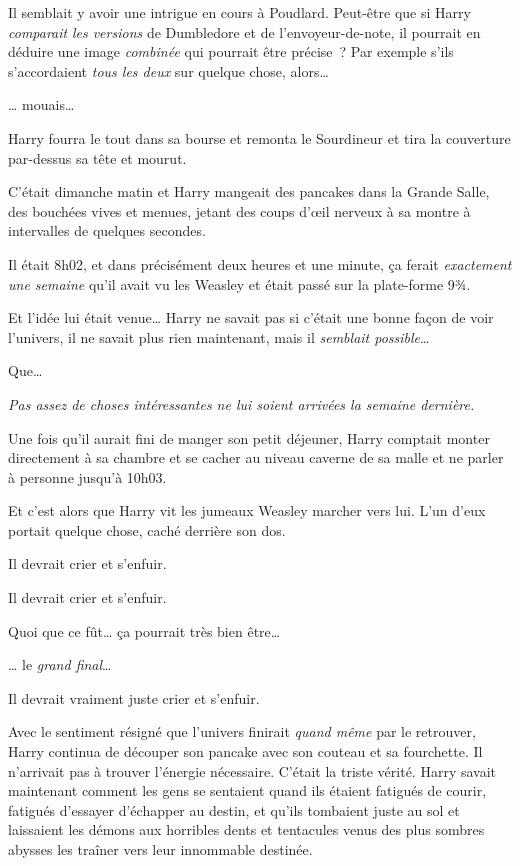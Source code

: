 Il semblait y avoir une intrigue en cours à Poudlard.
Peut-être que si Harry \emph{comparait} \emph{les versions} de Dumbledore et de l'envoyeur-de-note, il pourrait en déduire une image \emph{combinée} qui pourrait être précise~?
Par exemple s'ils s'accordaient \emph{tous les deux} sur quelque chose, alors…

… mouais…

Harry fourra le tout dans sa bourse et remonta le Sourdineur et tira la couverture par-dessus sa tête et mourut.

\later

C'était dimanche matin et Harry mangeait des pancakes dans la Grande Salle, des bouchées vives et menues, jetant des coups d'œil nerveux à sa montre à intervalles de quelques secondes.

Il était 8h02, et dans précisément deux heures et une minute, ça ferait \emph{exactement une semaine} qu'il avait vu les Weasley et était passé sur la plate-forme 9¾.

Et l'idée lui était venue…
Harry ne savait pas si c'était une bonne façon de voir l'univers, il ne savait plus rien maintenant, mais il \emph{semblait possible}…

Que…

\emph{Pas assez de choses intéressantes ne lui soient arrivées la semaine dernière.}

Une fois qu'il aurait fini de manger son petit déjeuner, Harry comptait monter directement à sa chambre et se cacher au niveau caverne de sa malle et ne parler à personne jusqu'à 10h03.

Et c'est alors que Harry vit les jumeaux Weasley marcher vers lui.
L'un d'eux portait quelque chose, caché derrière son dos.

Il devrait crier et s'enfuir.

Il devrait crier et s'enfuir.

Quoi que ce fût… ça pourrait très bien être…

… le \emph{grand final}…

Il devrait vraiment juste crier et s'enfuir.

Avec le sentiment résigné que l'univers finirait \emph{quand même} par le retrouver, Harry continua de découper son pancake avec son couteau et sa fourchette.
Il n'arrivait pas à trouver l'énergie nécessaire.
C'était la triste vérité.
Harry savait maintenant comment les gens se sentaient quand ils étaient fatigués de courir, fatigués d'essayer d'échapper au destin, et qu'ils tombaient juste au sol et laissaient les démons aux horribles dents et tentacules venus des plus sombres abysses les traîner vers leur innommable destinée.

